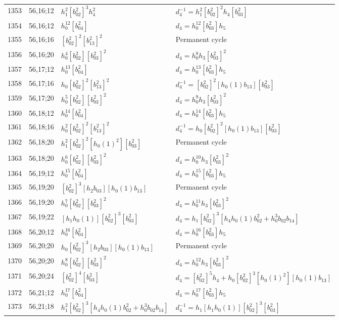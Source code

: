 \documentclass{article}
\begin{document}
\begin{longtable}{|l|l|>{\raggedright\arraybackslash}p{6cm}|>{\raggedright\arraybackslash}p{6cm}|}
\hline
1353 & 56,16;12 & $h_1^2[b_{02}^2]^3h_4^2$ & $d_{4}^{-1}=h_1^2[b_{02}^2]^2h_4[b_{03}^2]$\\
1354 & 56,16;12 & $h_0^{12}[b_{04}^2]$ &$d_{4}=h_0^{12}[b_{03}^2]h_5$\\
\hline
1355 & 56,16;16 & $[b_{02}^2]^2[b_{13}^2]^2$ & Permanent cycle\\
\hline
1356 & 56,16;20 & $h_0^4[b_{02}^2][b_{03}^2]^2$ &$d_{4}=h_0^8h_3[b_{03}^2]^2$\\
\hline
1357 & 56,17;12 & $h_0^{13}[b_{04}^2]$ &$d_{4}=h_0^{13}[b_{03}^2]h_5$\\
\hline
1358 & 56,17;16 & $h_0[b_{02}^2]^2[b_{13}^2]^2$ & $d_{4}^{-1}=[b_{02}^2]^2[h_0(1)b_{13}][b_{03}^2]$\\
\hline
1359 & 56,17;20 & $h_0^5[b_{02}^2][b_{03}^2]^2$ &$d_{4}=h_0^9h_3[b_{03}^2]^2$\\
\hline
1360 & 56,18;12 & $h_0^{14}[b_{04}^2]$ &$d_{4}=h_0^{14}[b_{03}^2]h_5$\\
\hline
1361 & 56,18;16 & $h_0^2[b_{02}^2]^2[b_{13}^2]^2$ & $d_{4}^{-1}=h_0[b_{02}^2]^2[h_0(1)b_{13}][b_{03}^2]$\\
\hline
1362 & 56,18;20 & $h_1^2[b_{02}^2]^2[h_0(1)^2][b_{03}^2]$ & Permanent cycle\\
1363 & 56,18;20 & $h_0^6[b_{02}^2][b_{03}^2]^2$ &$d_{4}=h_0^{10}h_3[b_{03}^2]^2$\\
\hline
1364 & 56,19;12 & $h_0^{15}[b_{04}^2]$ &$d_{4}=h_0^{15}[b_{03}^2]h_5$\\
\hline
1365 & 56,19;20 & $[b_{02}^2]^3[h_2b_{03}][h_0(1)b_{13}]$ & Permanent cycle\\
1366 & 56,19;20 & $h_0^7[b_{02}^2][b_{03}^2]^2$ &$d_{4}=h_0^{11}h_3[b_{03}^2]^2$\\
\hline
1367 & 56,19;22 & $[h_1h_0(1)][b_{02}^2]^3[b_{03}^2]$ &$d_{4}=h_1[b_{02}^2]^3[h_4h_0(1)b_{02}^2 + h_0^3b_{02}b_{14}]$\\
\hline
1368 & 56,20;12 & $h_0^{16}[b_{04}^2]$ &$d_{4}=h_0^{16}[b_{03}^2]h_5$\\
\hline
1369 & 56,20;20 & $h_0[b_{02}^2]^3[h_2b_{03}][h_0(1)b_{13}]$ & Permanent cycle\\
1370 & 56,20;20 & $h_0^8[b_{02}^2][b_{03}^2]^2$ &$d_{4}=h_0^{12}h_3[b_{03}^2]^2$\\
\hline
1371 & 56,20;24 & $[b_{02}^2]^4[b_{03}^2]$ &$d_{4}=[b_{02}^2]^5h_4 + h_0[b_{02}^2]^3[h_0(1)^2][h_0(1)b_{13}]$\\
\hline
1372 & 56,21;12 & $h_0^{17}[b_{04}^2]$ &$d_{4}=h_0^{17}[b_{03}^2]h_5$\\
\hline
1373 & 56,21;18 & $h_1^2[b_{02}^2]^3[h_4h_0(1)b_{02}^2 + h_0^3b_{02}b_{14}]$ & $d_{4}^{-1}=h_1[h_1h_0(1)][b_{02}^2]^3[b_{03}^2]$\\

\end{longtable}
\end{document}
